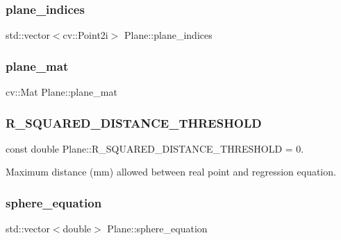 \subsubsection{\texorpdfstring{plane\+\_\+indices}{plane\_indices}}
{\footnotesize\ttfamily std\+::vector$<$cv\+::\+Point2i$>$ Plane\+::plane\+\_\+indices\hspace{0.3cm}{\ttfamily [private]}}

\hypertarget{class_plane_a79bafd16d43b07fd7db7ed942e285109}{}\label{class_plane_a79bafd16d43b07fd7db7ed942e285109} 
\subsubsection{\texorpdfstring{plane\+\_\+mat}{plane\_mat}}
{\footnotesize\ttfamily cv\+::\+Mat Plane\+::plane\+\_\+mat\hspace{0.3cm}{\ttfamily [private]}}

\hypertarget{class_plane_ae0e9b28377ab03e577aa6588da269328}{}\label{class_plane_ae0e9b28377ab03e577aa6588da269328} 
\subsubsection{\texorpdfstring{R\+\_\+\+S\+Q\+U\+A\+R\+E\+D\+\_\+\+D\+I\+S\+T\+A\+N\+C\+E\+\_\+\+T\+H\+R\+E\+S\+H\+O\+LD}{R\_SQUARED\_DISTANCE\_THRESHOLD}}
{\footnotesize\ttfamily const double Plane\+::\+R\+\_\+\+S\+Q\+U\+A\+R\+E\+D\+\_\+\+D\+I\+S\+T\+A\+N\+C\+E\+\_\+\+T\+H\+R\+E\+S\+H\+O\+LD = 0.}



Maximum distance (mm) allowed between real point and regression equation. 

\hypertarget{class_plane_aa8d9403da437be0c087354a8c891afcd}{}\label{class_plane_aa8d9403da437be0c087354a8c891afcd} 
\subsubsection{\texorpdfstring{sphere\+\_\+equation}{sphere\_equation}}
{\footnotesize\ttfamily std\+::vector$<$double$>$ Plane\+::sphere\+\_\+equation\hspace{0.3cm}{\ttfamily [private]}}

